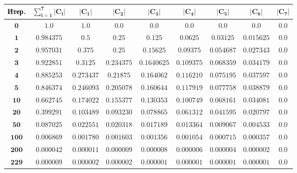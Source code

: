 	\noindent %
	\begin{minipage}{\textwidth}
		\vspace{\mfloatsep} %
		\centering\small
		\label{tab:constarint-values}
		\begin{tabular}{|c|c|c|c|c|c|c|c|c|}
			\hline
			\textbf{Итер.} & $\mathbf{\sum_{i = 1}^{7}|C_i|}$ & $\mathbf{|C_1|}$ & $\mathbf{|C_2|}$ & $\mathbf{|C_3|}$ & $\mathbf{|C_4|}$ & $\mathbf{|C_5|}$ & $\mathbf{|C_6|}$ & $\mathbf{|C_7|}$ \\
			\hline
			$\mathbf{0}$ & $1.0$ & $1.0$ & $0.0$ & $0.0$ & $0.0$ & $0.0$ & $0.0$ & $0.0$ \\ \hline
			$\mathbf{1}$ & $0.984375$ & $0.5$ & $0.25$ & $0.125$ & $0.0625$ & $0.03125$ & $0.015625$ & $0.0$ \\ \hline
			$\mathbf{2}$ & $0.957031$ & $0.375$ & $0.25$ & $0.15625$ & $0.09375$ & $0.054687$ & $0.027343$ & $0.0$ \\ \hline
			$\mathbf{3}$ & $0.922851$ & $0.3125$ & $0.234375$ & $0.1640625$ & $0.109375$ & $0.068359$ & $0.034179$ & $0.0$ \\ \hline
			$\mathbf{4}$ & $0.885253$ & $0.273437$ & $0.21875$ & $0.164062$ & $0.116210$ & $0.075195$ & $0.037597$ & $0.0$ \\ \hline
			$\mathbf{5}$ & $0.846374$ & $0.246093$ & $0.205078$ & $0.160644$ & $0.117919$ & $0.077758$ & $0.038879$ & $0.0$ \\ \hline
			$\mathbf{10}$ & $0.662745$ & $0.174022$ & $0.155377$ & $0.130353$ & $0.100749$ & $0.068161$ & $0.034081$ & $0.0$ \\ \hline
			$\mathbf{20}$ & $0.399291$ & $0.103489$ & $0.093230$ & $0.078865$ & $0.061312$ & $0.041595$ & $0.020797$ & $0.0$ \\ \hline
			$\mathbf{50}$ & $0.087025$ & $0.022551$ & $0.020318$ & $0.017189$ & $0.013364$ & $0.009067$ & $0.004533$ & $0.0$ \\ \hline
			$\mathbf{100}$ & $0.006869$ & $0.001780$ & $0.001603$ & $0.001356$ & $0.001054$ & $0.000715$ & $0.000357$ & $0.0$ \\ \hline
			$\mathbf{200}$ & $0.000042$ & $0.000011$ & $0.000009$ & $0.000008$ & $0.000006$ & $0.000004$ & $0.000002$ & $0.0$ \\ \hline
			$\mathbf{229}$ & $0.000009$ & $0.000002$ & $0.000002$ & $0.000001$ & $0.000001$ & $0.000001$ & $0.000001$ & $0.0$ \\ \hline
		\end{tabular}
		\vspace{\mfloatsep} %
		\normalsize %
	\end{minipage} 
	
